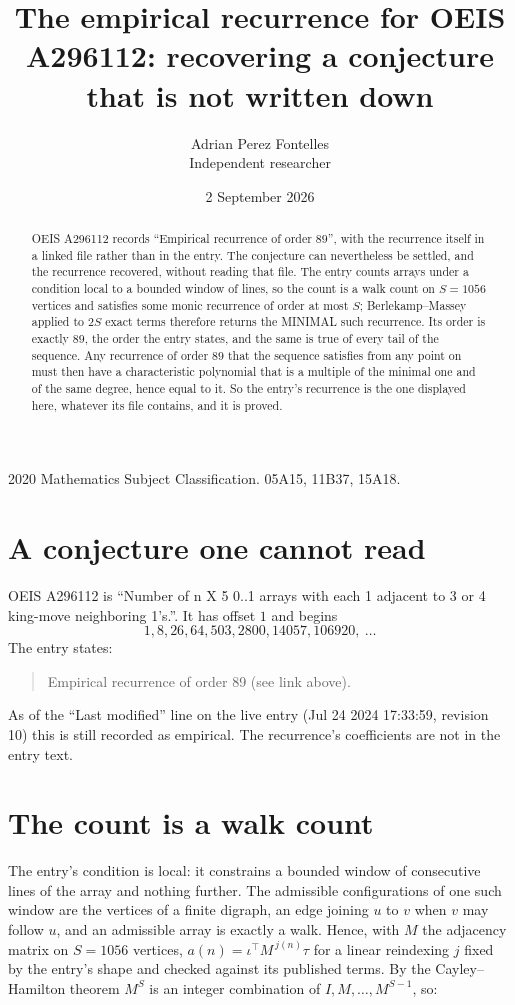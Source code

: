 \documentclass[11pt,a4paper]{article}
\title{The empirical recurrence for OEIS A296112: recovering a conjecture that is not written down}
\author{Adrian Perez Fontelles\\ \small Independent researcher}
\date{2 September 2026}
\theoremstyle{plain}
\theoremstyle{definition}
\begin{document}
\maketitle

\begin{abstract}
OEIS A296112 records ``Empirical recurrence of order $89$'', with the recurrence itself in a
linked file rather than in the entry. The conjecture can nevertheless be settled, and the
recurrence recovered, without reading that file. The entry counts arrays under a condition
local to a bounded window of lines, so the count is a walk count on $S=1056$ vertices and
satisfies some monic recurrence of order at most $S$; Berlekamp--Massey applied to $2S$ exact
terms therefore returns the MINIMAL such recurrence. Its order is exactly $89$, the order
the entry states, and the same is true of every tail of the sequence. Any recurrence of order
$89$ that the sequence satisfies from any point on must then have a characteristic
polynomial that is a multiple of the minimal one and of the same degree, hence equal to it. So
the entry's recurrence is the one displayed here, whatever its file contains, and it is
proved.
\end{abstract}

\noindent\small 2020 Mathematics Subject Classification. 05A15, 11B37, 15A18.\normalsize

\section{A conjecture one cannot read}

OEIS A296112 is ``Number of n X 5 0..1 arrays with each 1 adjacent to 3 or 4 king-move neighboring 1's.''. It has offset $1$ and begins
\[
1, 8, 26, 64, 503, 2800, 14057, 106920,\ \dots
\]
The entry states:
\begin{quote}
Empirical recurrence of order 89 (see link above).
\end{quote}
As of the ``Last modified'' line on the live entry (Jul 24 2024 17:33:59, revision 10) this is still
recorded as empirical. The recurrence's coefficients are not in the entry text.

\section{The count is a walk count}

The entry's condition is local: it constrains a bounded window of consecutive lines of the
array and nothing further. The admissible configurations of one such window are the vertices
of a finite digraph, an edge joining $u$ to $v$ when $v$ may follow $u$, and an admissible
array is exactly a walk. Hence, with $M$ the adjacency matrix on $S=1056$ vertices,
$a(n)=\iota^{\!\top}M^{\,j(n)}\tau$ for a linear reindexing $j$ fixed by the entry's shape
and checked against its published terms. By the Cayley--Hamilton theorem $M^{S}$ is an
integer combination of $I,M,\dots,M^{S-1}$, so:
\end{document}
